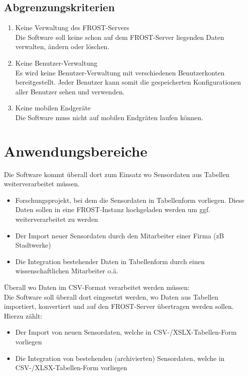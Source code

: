 \documentclass[a4paper, 12 pt]{article}
\begin{document}
	\subsection{Abgrenzungskriterien}
	\begin{enumerate}
	\item Keine Verwaltung des FROST-Servers \\
	Die Software soll keine schon auf dem FROST-Server liegenden Daten verwalten, ändern oder löschen.
	\item Keine Benutzer-Verwaltung \\
	Es wird keine Benutzer-Verwaltung mit verschiedenen Benutzerkonten bereitgestellt.
	Jeder Benutzer kann somit die gespeicherten Konfigurationen aller Benutzer sehen und verwenden.
	\item Keine mobilen Endgeräte \\
	Die Software muss nicht auf mobilen Endgräten laufen können.
	\end{enumerate}

\newpage
\section{Anwendungsbereiche}
Die Software kommt überall dort zum Einsatz wo Sensordaten aus Tabellen weiterverarbeitet müssen. \\
\begin{itemize}
	\item Forschungsprojekt, bei dem die Sensordaten in Tabellenform vorliegen. Diese Daten sollen in eine FROST-Instanz hochgeladen werden um ggf. weiterverarbeitet zu werden
	\item Der Import neuer Sensordaten durch den Mitarbeiter einer Firma (zB Stadtwerke)
	\item Die Integration bestehender Daten in Tabellenform durch einen wissenschaftlichen Mitarbeiter o.ä.
\end{itemize}



Überall wo Daten im CSV-Format verarbeitet werden müssen: \\
Die Software soll überall dort eingesetzt werden, wo Daten aus Tabellen importiert, konvertiert und auf den FROST-Server übertragen werden sollen. \\
Hierzu zählt:
\begin{itemize}
	\item Der Import von neuen Sensordaten, welche in CSV-/XSLX-Tabellen-Form vorliegen
	\item Die Integration von bestehenden (archivierten) Sensordaten, welche in CSV-/XLSX-Tabellen-Form vorliegen
\end{itemize}
\end{document}
